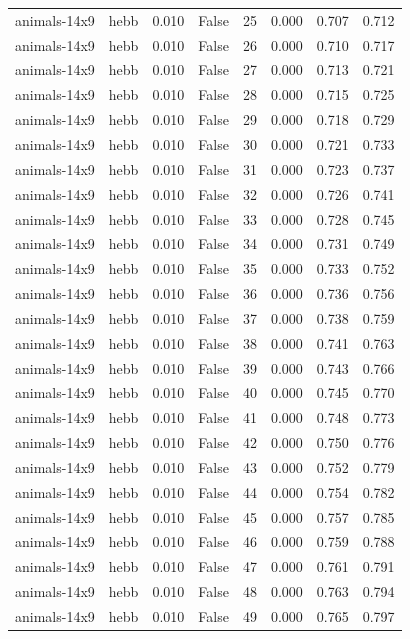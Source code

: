 \begin{tabular}{llrrrrrr}
animals-14x9 & hebb & 0.010 & False & 25 & 0.000 & 0.707 & 0.712 \\
animals-14x9 & hebb & 0.010 & False & 26 & 0.000 & 0.710 & 0.717 \\
animals-14x9 & hebb & 0.010 & False & 27 & 0.000 & 0.713 & 0.721 \\
animals-14x9 & hebb & 0.010 & False & 28 & 0.000 & 0.715 & 0.725 \\
animals-14x9 & hebb & 0.010 & False & 29 & 0.000 & 0.718 & 0.729 \\
animals-14x9 & hebb & 0.010 & False & 30 & 0.000 & 0.721 & 0.733 \\
animals-14x9 & hebb & 0.010 & False & 31 & 0.000 & 0.723 & 0.737 \\
animals-14x9 & hebb & 0.010 & False & 32 & 0.000 & 0.726 & 0.741 \\
animals-14x9 & hebb & 0.010 & False & 33 & 0.000 & 0.728 & 0.745 \\
animals-14x9 & hebb & 0.010 & False & 34 & 0.000 & 0.731 & 0.749 \\
animals-14x9 & hebb & 0.010 & False & 35 & 0.000 & 0.733 & 0.752 \\
animals-14x9 & hebb & 0.010 & False & 36 & 0.000 & 0.736 & 0.756 \\
animals-14x9 & hebb & 0.010 & False & 37 & 0.000 & 0.738 & 0.759 \\
animals-14x9 & hebb & 0.010 & False & 38 & 0.000 & 0.741 & 0.763 \\
animals-14x9 & hebb & 0.010 & False & 39 & 0.000 & 0.743 & 0.766 \\
animals-14x9 & hebb & 0.010 & False & 40 & 0.000 & 0.745 & 0.770 \\
animals-14x9 & hebb & 0.010 & False & 41 & 0.000 & 0.748 & 0.773 \\
animals-14x9 & hebb & 0.010 & False & 42 & 0.000 & 0.750 & 0.776 \\
animals-14x9 & hebb & 0.010 & False & 43 & 0.000 & 0.752 & 0.779 \\
animals-14x9 & hebb & 0.010 & False & 44 & 0.000 & 0.754 & 0.782 \\
animals-14x9 & hebb & 0.010 & False & 45 & 0.000 & 0.757 & 0.785 \\
animals-14x9 & hebb & 0.010 & False & 46 & 0.000 & 0.759 & 0.788 \\
animals-14x9 & hebb & 0.010 & False & 47 & 0.000 & 0.761 & 0.791 \\
animals-14x9 & hebb & 0.010 & False & 48 & 0.000 & 0.763 & 0.794 \\
animals-14x9 & hebb & 0.010 & False & 49 & 0.000 & 0.765 & 0.797 \\

\end{tabular}
